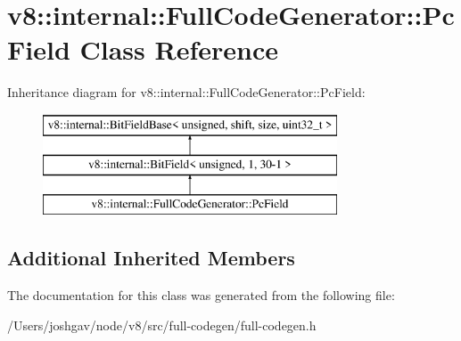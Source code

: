\hypertarget{classv8_1_1internal_1_1_full_code_generator_1_1_pc_field}{}\section{v8\+:\+:internal\+:\+:Full\+Code\+Generator\+:\+:Pc\+Field Class Reference}
\label{classv8_1_1internal_1_1_full_code_generator_1_1_pc_field}
Inheritance diagram for v8\+:\+:internal\+:\+:Full\+Code\+Generator\+:\+:Pc\+Field\+:\begin{figure}[H]
\begin{center}
\leavevmode
\includegraphics[height=3.000000cm]{classv8_1_1internal_1_1_full_code_generator_1_1_pc_field}
\end{center}
\end{figure}
\subsection*{Additional Inherited Members}


The documentation for this class was generated from the following file\+:\begin{DoxyCompactItemize}
\item 
/\+Users/joshgav/node/v8/src/full-\/codegen/full-\/codegen.\+h\end{DoxyCompactItemize}
